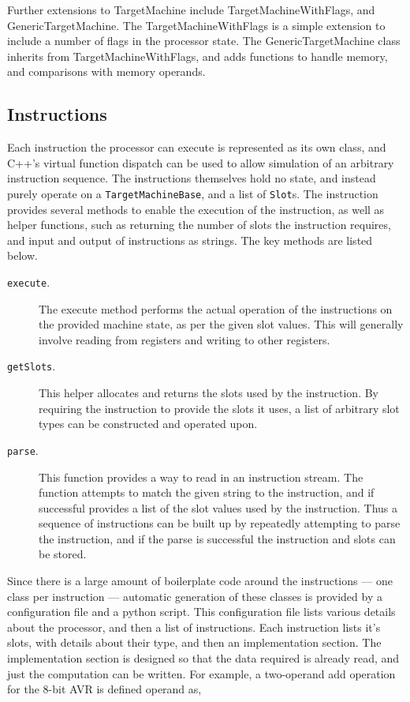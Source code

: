 \documentclass{article}
\begin{document}
Further extensions to TargetMachine include TargetMachineWithFlags, and GenericTargetMachine. The TargetMachineWithFlags is a simple extension to include a number of flags in the processor state. The GenericTargetMachine class inherits from TargetMachineWithFlags, and adds functions to handle memory, and comparisons with memory operands.

\subsection{Instructions}

Each instruction the processor can execute is represented as its own class, and C++'s virtual function dispatch can be used to allow simulation of an arbitrary instruction sequence. The instructions themselves hold no state, and instead purely operate on a \texttt{TargetMachineBase}, and a list of \texttt{Slot}s. The instruction provides several methods to enable the execution of the instruction, as well as helper functions, such as returning the number of slots the instruction requires, and input and output of instructions as strings. The key methods are listed below.

\begin{description}
    \item[\texttt{execute}.] The execute method performs the actual operation of the instructions on the provided machine state, as per the given slot values. This will generally involve reading from registers and writing to other registers.
    \item[\texttt{getSlots}.] This helper allocates and returns the slots used by the instruction. By requiring the instruction to provide the slots it uses, a list of arbitrary slot types can be constructed and operated upon.
    \item[\texttt{parse}.] This function provides a way to read in an instruction stream. The function attempts to match the given string to the instruction, and if successful provides a list of the slot values used by the instruction. Thus a sequence of instructions can be built up by repeatedly attempting to parse the instruction, and if the parse is successful the instruction and slots can be stored.
\end{description}

Since there is a large amount of boilerplate code around the instructions --- one class per instruction --- automatic generation of these classes is provided by a configuration file and a python script. This configuration file lists various details about the processor, and then a list of instructions. Each instruction lists it's slots, with details about their type, and then an implementation section. The implementation section is designed so that the data required is already read, and just the computation can be written. For example, a two-operand add operation for the 8-bit AVR is defined operand as,
\end{document}
